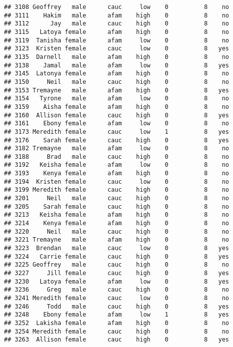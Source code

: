 \documentclass[
]{article}
\begin{document}
\begin{verbatim}
## 3108 Geoffrey   male      cauc     low    0          8    no
## 3111    Hakim   male      afam    high    0          8    no
## 3112      Jay   male      cauc    high    0          8    no
## 3115   Latoya female      afam    high    0          8    no
## 3119  Tanisha female      afam     low    0          8    no
## 3123  Kristen female      cauc     low    0          8   yes
## 3135  Darnell   male      afam    high    0          8    no
## 3138    Jamal   male      afam     low    0          8   yes
## 3145  Latonya female      afam    high    0          8    no
## 3150     Neil   male      cauc    high    0          8    no
## 3153 Tremayne   male      afam    high    0          8   yes
## 3154   Tyrone   male      afam     low    0          8    no
## 3159    Aisha female      afam    high    0          8    no
## 3160  Allison female      cauc    high    0          8   yes
## 3161    Ebony female      afam     low    0          8    no
## 3173 Meredith female      cauc     low    1          8   yes
## 3176    Sarah female      cauc    high    0          8   yes
## 3182 Tremayne   male      afam     low    0          8    no
## 3188     Brad   male      cauc    high    0          8    no
## 3192   Keisha female      afam     low    0          8    no
## 3193    Kenya female      afam    high    0          8    no
## 3194  Kristen female      cauc     low    0          8    no
## 3199 Meredith female      cauc    high    0          8    no
## 3201     Neil   male      cauc    high    0          8    no
## 3205    Sarah female      cauc    high    0          8    no
## 3213   Keisha female      afam    high    0          8    no
## 3214    Kenya female      afam    high    0          8    no
## 3220     Neil   male      cauc    high    0          8    no
## 3221 Tremayne   male      afam    high    0          8    no
## 3223  Brendan   male      cauc     low    0          8   yes
## 3224   Carrie female      cauc    high    0          8   yes
## 3225 Geoffrey   male      cauc    high    0          8    no
## 3227     Jill female      cauc    high    0          8   yes
## 3230   Latoya female      afam     low    0          8   yes
## 3236     Greg   male      cauc    high    0          8    no
## 3241 Meredith female      cauc     low    0          8    no
## 3246     Todd   male      cauc    high    0          8   yes
## 3248    Ebony female      afam     low    1          8   yes
## 3252  Lakisha female      afam    high    0          8    no
## 3254 Meredith female      cauc    high    0          8    no
## 3263  Allison female      cauc    high    0          8   yes

\end{verbatim}
\end{document}
